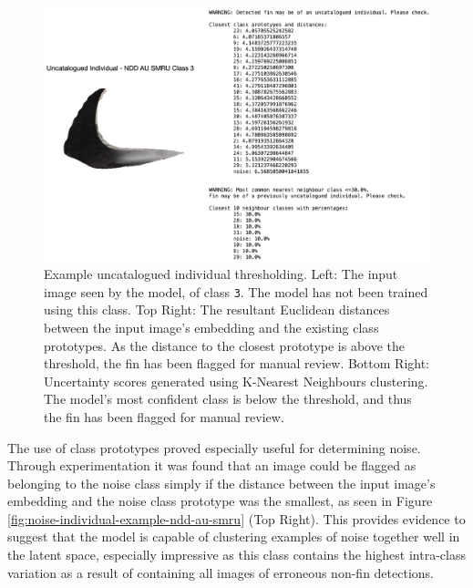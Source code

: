 \begin{figure}[t]
	\begin{center}
		\includegraphics[scale=0.6]{Chapter5/figs/uncatalogued-individual-example-ndd-au-smru.png}
	\end{center}
	\caption[Example uncatalogued individual thresholding.]{Example uncatalogued individual thresholding. Left: The input image seen by the model, of class \texttt{3}. The model has not been trained using this class. Top Right: The resultant Euclidean distances between the input image's embedding and the existing class prototypes. As the distance to the closest prototype is above the threshold, the fin has been flagged for manual review. Bottom Right: Uncertainty scores generated using K-Nearest Neighbours clustering. The model's most confident class is below the threshold, and thus the fin has been flagged for manual review.}
	\label{fig:uncatalogued-individual-example-ndd-au-smru}
\end{figure}

The use of class prototypes proved especially useful for determining noise. Through experimentation it was found that an image could be flagged as belonging to the noise class simply if the distance between the input image's embedding and the noise class prototype was the smallest, as seen in Figure \ref{fig:noise-individual-example-ndd-au-smru} (Top Right). This provides evidence to suggest that the model is capable of clustering examples of noise together well in the latent space, especially impressive as this class contains the highest intra-class variation as a result of containing all images of erroneous non-fin detections.


